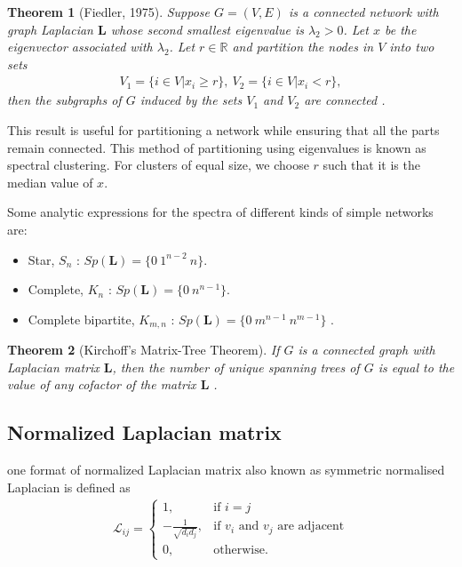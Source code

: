 \documentclass[10pt,a4paper]{article}
\newtheorem{thm}{Theorem}
\begin{document}
\begin{thm}[Fiedler, 1975]
	Suppose $G = (V,E)$ is a connected network with graph Laplacian $\mathbf{L}$ whose second smallest eigenvalue is $\lambda_2 > 0$. Let $x$ be the eigenvector associated with $\lambda_2$. Let $r \in \mathbb{R}$ and partition the nodes in $V$ into two sets
	\begin{eqnarray}
	V_1 = \{i \in V|x_i \geq r\}, ~ V_2 = \{i \in V | x_i < r\}, 
	\end{eqnarray}
	then the subgraphs of $G$ induced by the sets $V_1$ and $V_2$ are connected \citep{estrada2015first}.
	\label{fiedler}
\end{thm}
This result is useful for partitioning a network while ensuring that all the parts remain connected. This method of partitioning using eigenvalues is known as spectral clustering. For clusters of equal size, we choose $r$ such that it is the median value of $x$. 


Some analytic expressions for the spectra of different kinds of simple networks are:
\begin{itemize}
	\item Star, $S_n$ : $Sp(\mathbf{L}) = \{ 0~ 1^{n-2}~n\}$. 
	
	\item Complete, $K_n$ : $Sp(\mathbf{L}) = \{ 0~ n^{n-1} \}$. 
	
	\item Complete bipartite, $K_{m,n}$ : $Sp(\mathbf{L}) =\{ 0 ~ m^{n-1} ~ n^{m-1}\}$ \citep{estrada2011structure}.
	
\end{itemize}

\begin{thm}[Kirchoff's Matrix-Tree Theorem]
	If $G$ is a connected graph with Laplacian matrix $\mathbf{L}$, then the number of unique spanning trees of $G$ is equal to the value of any cofactor of the matrix $\mathbf{L}$ \citep{harris2008combinatorics}.
	\label{thm:kirchoff}
\end{thm}

\subsection{Normalized Laplacian matrix}
one format of normalized Laplacian matrix also known as symmetric normalised Laplacian is defined as 
\begin{eqnarray*}
	\mathcal{L}_{ij} = \begin{cases} 1, &\mbox{if } i = j \\
		- \frac{1}{\sqrt{d_i d_j}}, &\mbox{if } v_i \text{ and } v_j \text{ are adjacent} \\ 
		0, & \text{otherwise}.
	\end{cases}
\end{eqnarray*}
\end{document}
